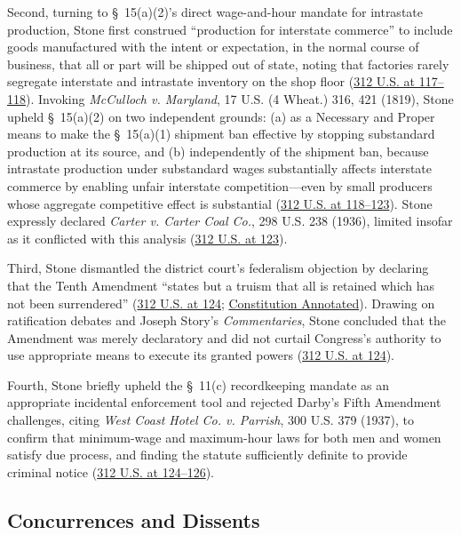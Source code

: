 \documentclass[12pt]{article}
\begin{document}
Second, turning to \S~15(a)(2)'s direct wage-and-hour mandate for intrastate production, Stone first construed ``production for interstate commerce'' to include goods manufactured with the intent or expectation, in the normal course of business, that all or part will be shipped out of state, noting that factories rarely segregate interstate and intrastate inventory on the shop floor (\href{https://supreme.justia.com/cases/federal/us/312/100/}{312 U.S. at 117--118}). Invoking \textit{McCulloch v. Maryland}, 17 U.S. (4 Wheat.) 316, 421 (1819), Stone upheld \S~15(a)(2) on two independent grounds: (a) as a Necessary and Proper means to make the \S~15(a)(1) shipment ban effective by stopping substandard production at its source, and (b) independently of the shipment ban, because intrastate production under substandard wages substantially affects interstate commerce by enabling unfair interstate competition---even by small producers whose aggregate competitive effect is substantial (\href{https://supreme.justia.com/cases/federal/us/312/100/}{312 U.S. at 118--123}). Stone expressly declared \textit{Carter v. Carter Coal Co.}, 298 U.S. 238 (1936), limited insofar as it conflicted with this analysis (\href{https://supreme.justia.com/cases/federal/us/312/100/}{312 U.S. at 123}).

Third, Stone dismantled the district court's federalism objection by declaring that the Tenth Amendment ``states but a truism that all is retained which has not been surrendered'' (\href{https://supreme.justia.com/cases/federal/us/312/100/}{312 U.S. at 124}; \href{https://www.law.cornell.edu/constitution-conan/amendment-10/the-tenth-amendment-and-darby}{Constitution Annotated}). Drawing on ratification debates and Joseph Story's \textit{Commentaries}, Stone concluded that the Amendment was merely declaratory and did not curtail Congress's authority to use appropriate means to execute its granted powers (\href{https://supreme.justia.com/cases/federal/us/312/100/}{312 U.S. at 124}).

Fourth, Stone briefly upheld the \S~11(c) recordkeeping mandate as an appropriate incidental enforcement tool and rejected Darby's Fifth Amendment challenges, citing \textit{West Coast Hotel Co. v. Parrish}, 300 U.S. 379 (1937), to confirm that minimum-wage and maximum-hour laws for both men and women satisfy due process, and finding the statute sufficiently definite to provide criminal notice (\href{https://supreme.justia.com/cases/federal/us/312/100/}{312 U.S. at 124--126}).

\subsection{Concurrences and Dissents}
\end{document}
